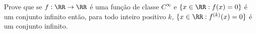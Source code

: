 Prove que se $f : \RR \to \RR$ é uma função de classe $C^\infty$ e $\{x \in \RR : f(x) = 0\}$ é um conjunto infinito então, para todo inteiro positivo $k$, $\{ x \in \RR : f^{(k)}(x) = 0\}$ é um conjunto infinito.